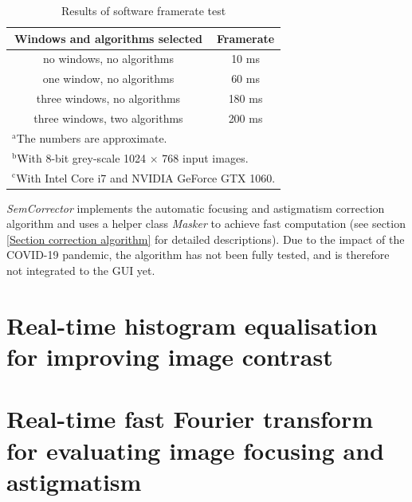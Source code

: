 \documentclass[12pt, conference]{IEEEtran}
\begin{document}
\begin{table}[htbp]
    \caption{Results of software framerate test}
    \begin{center}
    \begin{tabular}{|c|c|}
    \hline
    \textbf{Windows and algorithms selected} & \textbf{Framerate} \\
    \hline
    no windows, no algorithms & 10 ms \\
    \hline
    one window, no algorithms & 60 ms \\
    \hline
    three windows, no algorithms & 180 ms \\
    \hline
    three windows, two algorithms & 200 ms \\
    \hline
    \multicolumn{2}{l}{$^{\mathrm{a}}$The numbers are approximate.} \\
    \multicolumn{2}{l}{$^{\mathrm{b}}$With 8-bit grey-scale 1024 $\times$ 768 input images.} \\
    \multicolumn{2}{l}{$^{\mathrm{c}}$With Intel Core i7 and NVIDIA GeForce GTX 1060.}
    \end{tabular}
    \label{Software framerates}
    \end{center}
\end{table}

\textit{SemCorrector} implements the automatic focusing and astigmatism correction algorithm and uses a helper class \textit{Masker} to achieve fast computation (see section \ref{Section correction algorithm} for detailed descriptions). Due to the impact of the COVID-19 pandemic, the algorithm has not been fully tested, and is therefore not integrated to the GUI yet.

\section{Real-time histogram equalisation for improving image contrast}
\label{Section histogram equalisation}

\section{Real-time fast Fourier transform for evaluating image focusing and astigmatism}
\label{Section FFT}
\end{document}
